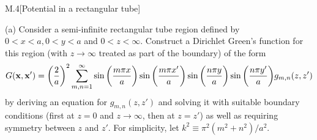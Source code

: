\documentclass[12pt]{article}
\begin{document}
\newpage
\begin{problem}{M.4}[Potential in a rectangular tube]

(a) Consider a semi-infinite rectangular tube region defined by $0<x<a,0<y<a$
and $0<z<\infty$. Construct a Dirichlet Green's function for this region (with
$z\to\infty$ treated as part of the boundary) of the form
\begin{equation}\label{p4:G}
    G(\vb{x},\vb{x}')=\qty(\frac{2}{a})^2\sum_{m,n=1}^\infty\sin\qty(\frac{m\pi
    x}{a})\sin\qty(\frac{m\pi x'}{a})\sin\qty(\frac{n\pi
y}{a})\sin\qty(\frac{n\pi y'}{a})g_{m,n}(z,z')
\end{equation}
by deriving an equation for $g_{m,n}(z,z')$ and solving it with suitable
boundary conditions (first at $z=0$ and $z\to\infty$, then at $z=z'$) as well as
requiring symmetry between $z$ and $z'$. For simplicity, let
$k^2\equiv\pi^2(m^2+n^2) /a^2$.


\end{problem}
\end{document}
